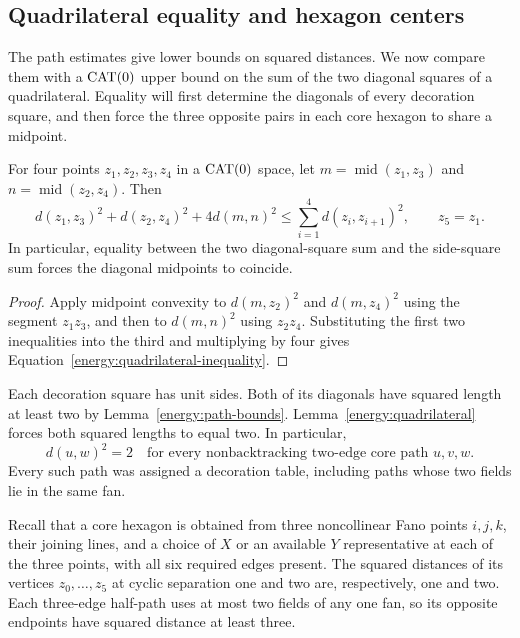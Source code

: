 \subsection{Quadrilateral equality and hexagon centers}

The path estimates give lower bounds on squared distances.  We now
compare them with a $\operatorname{CAT}(0)$ upper bound on the sum of the two
diagonal squares of a quadrilateral.  Equality will first determine
the diagonals of every decoration square, and then force the three
opposite pairs in each core hexagon to share a midpoint.

\begin{lemma}\label{energy:quadrilateral}
For four points $z_1,z_2,z_3,z_4$ in a $\operatorname{CAT}(0)$ space, let
$m=\operatorname{mid}(z_1,z_3)$ and
$n=\operatorname{mid}(z_2,z_4)$.  Then
\begin{equation}\label{energy:quadrilateral-inequality}
 d(z_1,z_3)^2+d(z_2,z_4)^2+4d(m,n)^2
 \le\sum_{i=1}^4d(z_i,z_{i+1})^2,
 \qquad z_5=z_1.
\end{equation}
In particular, equality between the two diagonal-square sum and the
side-square sum forces the diagonal midpoints to coincide.
\end{lemma}

\begin{proof}
Apply midpoint convexity to $d(m,z_2)^2$ and $d(m,z_4)^2$ using the
segment $z_1z_3$, and then to $d(m,n)^2$ using $z_2z_4$.  Substituting
the first two inequalities into the third and multiplying by four
gives Equation~\eqref{energy:quadrilateral-inequality}.
\end{proof}

Each decoration square has unit sides.  Both of its diagonals have
squared length at least two by Lemma~\ref{energy:path-bounds}.
Lemma~\ref{energy:quadrilateral} forces both squared lengths to equal
two.  In particular,
\begin{equation}\label{energy:two-step-equality}
 d(u,w)^2=2
 \quad\text{for every nonbacktracking two-edge core path }u,v,w.
\end{equation}
Every such path was assigned a decoration table, including paths
whose two fields lie in the same fan.

Recall that a core hexagon is obtained from three
noncollinear Fano points $i,j,k$, their joining lines, and a choice of
$X$ or an available $Y$ representative at each of the three points,
with all six required edges present.  The squared distances of its
vertices $z_0,\ldots,z_5$ at cyclic separation one and two are,
respectively, one and two.  Each three-edge half-path uses at most
two fields of any one fan, so its opposite endpoints have squared
distance at least three.

